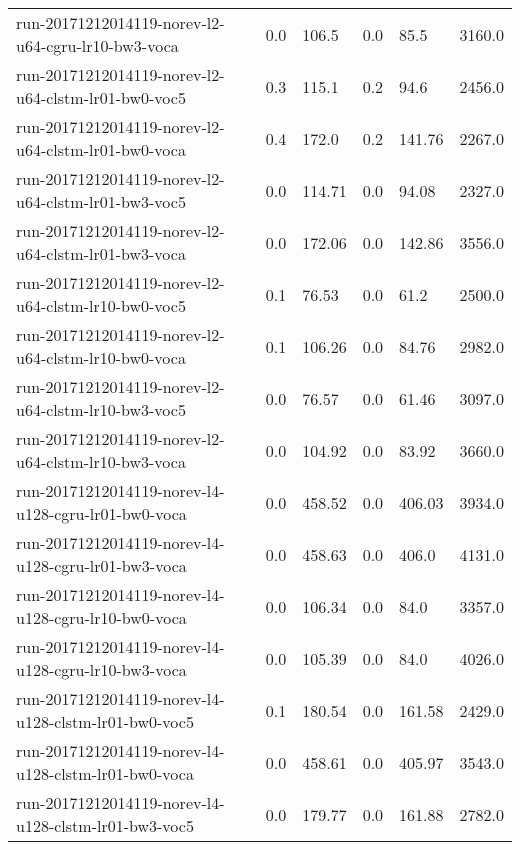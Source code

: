 \begin{landscape}
\begin{longtable}{p{.47\textheight} p{.08\textheight} p{.08\textheight} p{.08\textheight} p{.08\textheight} p{.08\textheight}}
    run-20171212014119-norev-l2-u64-cgru-lr10-bw3-voca & \num{0.0} & \num{106.5} & \num{0.0} & \num{85.5} & \num{3160.0}\\
    run-20171212014119-norev-l2-u64-clstm-lr01-bw0-voc5 & \num{0.3} & \num{115.1} & \num{0.2} & \num{94.6} & \num{2456.0}\\
    run-20171212014119-norev-l2-u64-clstm-lr01-bw0-voca & \num{0.4} & \num{172.0} & \num{0.2} & \num{141.76} & \num{2267.0}\\
    run-20171212014119-norev-l2-u64-clstm-lr01-bw3-voc5 & \num{0.0} & \num{114.71} & \num{0.0} & \num{94.08} & \num{2327.0}\\
    run-20171212014119-norev-l2-u64-clstm-lr01-bw3-voca & \num{0.0} & \num{172.06} & \num{0.0} & \num{142.86} & \num{3556.0}\\
    run-20171212014119-norev-l2-u64-clstm-lr10-bw0-voc5 & \num{0.1} & \num{76.53} & \num{0.0} & \num{61.2} & \num{2500.0}\\
    run-20171212014119-norev-l2-u64-clstm-lr10-bw0-voca & \num{0.1} & \num{106.26} & \num{0.0} & \num{84.76} & \num{2982.0}\\
    run-20171212014119-norev-l2-u64-clstm-lr10-bw3-voc5 & \num{0.0} & \num{76.57} & \num{0.0} & \num{61.46} & \num{3097.0}\\
    run-20171212014119-norev-l2-u64-clstm-lr10-bw3-voca & \num{0.0} & \num{104.92} & \num{0.0} & \num{83.92} & \num{3660.0}\\
    run-20171212014119-norev-l4-u128-cgru-lr01-bw0-voca & \num{0.0} & \num{458.52} & \num{0.0} & \num{406.03} & \num{3934.0}\\
    run-20171212014119-norev-l4-u128-cgru-lr01-bw3-voca & \num{0.0} & \num{458.63} & \num{0.0} & \num{406.0} & \num{4131.0}\\
    run-20171212014119-norev-l4-u128-cgru-lr10-bw0-voca & \num{0.0} & \num{106.34} & \num{0.0} & \num{84.0} & \num{3357.0}\\
    run-20171212014119-norev-l4-u128-cgru-lr10-bw3-voca & \num{0.0} & \num{105.39} & \num{0.0} & \num{84.0} & \num{4026.0}\\
    run-20171212014119-norev-l4-u128-clstm-lr01-bw0-voc5 & \num{0.1} & \num{180.54} & \num{0.0} & \num{161.58} & \num{2429.0}\\
    run-20171212014119-norev-l4-u128-clstm-lr01-bw0-voca & \num{0.0} & \num{458.61} & \num{0.0} & \num{405.97} & \num{3543.0}\\
    run-20171212014119-norev-l4-u128-clstm-lr01-bw3-voc5 & \num{0.0} & \num{179.77} & \num{0.0} & \num{161.88} & \num{2782.0}\\

\end{longtable}
\end{landscape}
